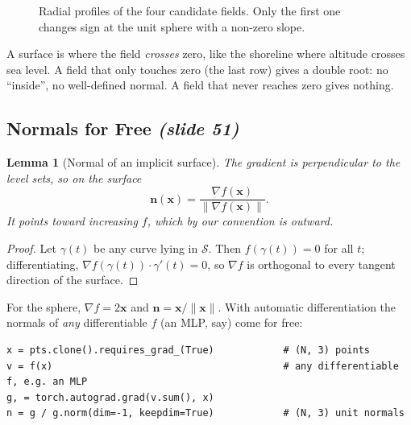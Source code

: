 \documentclass[11pt,a4paper]{article}
\newcommand{\Surf}{\mathcal{S}}
\newcommand{\vx}{\bm{x}}
\newcommand{\vn}{\bm{n}}
\newcommand{\norm}[1]{\lVert #1\rVert}
\theoremstyle{definition}
\theoremstyle{plain}
\newtheorem{lemma}[definition]{Lemma}
\theoremstyle{remark}
\newcommand{\slides}[1]{\texorpdfstring{\emph{(#1)}}{(#1)}}
\begin{document}
\begin{figure}[ht]
\centering
{}
\caption{Radial profiles of the four candidate fields. Only the first one changes sign at the unit sphere with a non-zero slope.}
\end{figure}

\begin{intuition}
A surface is where the field \emph{crosses} zero, like the shoreline where altitude crosses sea level. A field that only touches zero (the last row) gives a double root: no ``inside'', no well-defined normal. A field that never reaches zero gives nothing.
\end{intuition}

\subsection{Normals for Free \slides{slide 51}}
\begin{lemma}[Normal of an implicit surface]
The gradient is perpendicular to the level sets, so on the surface
\[
\vn(\vx)=\frac{\nabla f(\vx)}{\norm{\nabla f(\vx)}}.
\]
It points toward increasing $f$, which by our convention is \emph{outward}.
\end{lemma}
\begin{proof}
Let $\gamma(t)$ be any curve lying in $\Surf$. Then $f(\gamma(t))=0$ for all $t$; differentiating, $\nabla f(\gamma(t))\cdot\gamma'(t)=0$, so $\nabla f$ is orthogonal to every tangent direction of the surface.
\end{proof}

For the sphere, $\nabla f=2\vx$ and $\vn=\vx/\norm{\vx}$. With automatic differentiation the normals of \emph{any} differentiable $f$ (an MLP, say) come for free:
\begin{lstlisting}
x = pts.clone().requires_grad_(True)            # (N, 3) points
v = f(x)                                        # any differentiable f, e.g. an MLP
g, = torch.autograd.grad(v.sum(), x)
n = g / g.norm(dim=-1, keepdim=True)            # (N, 3) unit normals
\end{lstlisting}
\end{document}
